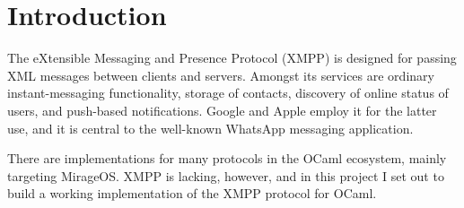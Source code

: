 \chapter{Introduction}
The eXtensible Messaging and Presence Protocol (XMPP) is designed for passing XML messages between clients and servers. Amongst its services are ordinary instant-messaging functionality, storage of contacts, discovery of online status of users, and push-based notifications. Google and Apple employ it for the latter use, and it is central to the well-known WhatsApp messaging application.

There are implementations for many protocols in the OCaml ecosystem, mainly targeting MirageOS. XMPP is lacking, however, and in this project I set out to build a working implementation of the XMPP protocol for OCaml.
